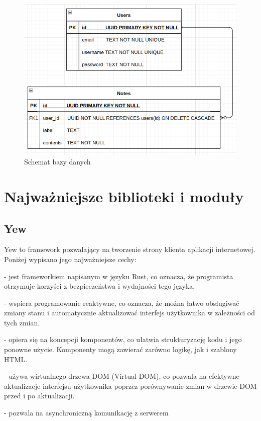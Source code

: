 \documentclass[a4paper,twoside,12pt]{book}
\begin{document}
\begin{figure}[H]
\centering
\includegraphics[width=1.0\textwidth]{./images/schemat-bazy.png}
\caption{Schemat bazy danych}
\label{fig:schemat-bazy}
\end{figure}


\section{Najważniejsze biblioteki i moduły}
\subsection{Yew}

Yew to framework pozwalający na tworzenie strony klienta aplikacji internetowej.
Poniżej wypisano jego najważniejsze cechy:

- jest frameworkiem napisanym w języku Rust, co oznacza,
że programista otrzymuje korzyści z bezpieczeństwa i wydajności tego języka.

- wspiera programowanie reaktywne, co oznacza, że można łatwo obsługiwać zmiany stanu i automatycznie aktualizować interfejs użytkownika w zależności od tych zmian.

- opiera się na koncepcji komponentów, co ułatwia strukturyzację kodu i jego ponowne użycie. Komponenty mogą zawierać zarówno logikę, jak i szablony HTML.

- używa wirtualnego drzewa DOM (Virtual DOM), co pozwala na efektywne aktualizacje interfejsu użytkownika poprzez porównywanie zmian w drzewie DOM przed i po aktualizacji.

- pozwala na asynchroniczną komunikację z serwerem
\end{document}

